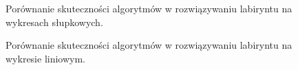 \documentclass{article}
\begin{document}
\begin{figure}[H]
    \centering
    \caption{Porównanie skuteczności algorytmów w rozwiązywaniu labiryntu na wykresach słupkowych.}
\end{figure}

\begin{figure}[H]
    \centering
    \caption{Porównanie skuteczności algorytmów w rozwiązywaniu labiryntu na wykresie liniowym.}
\end{figure}
\end{document}
